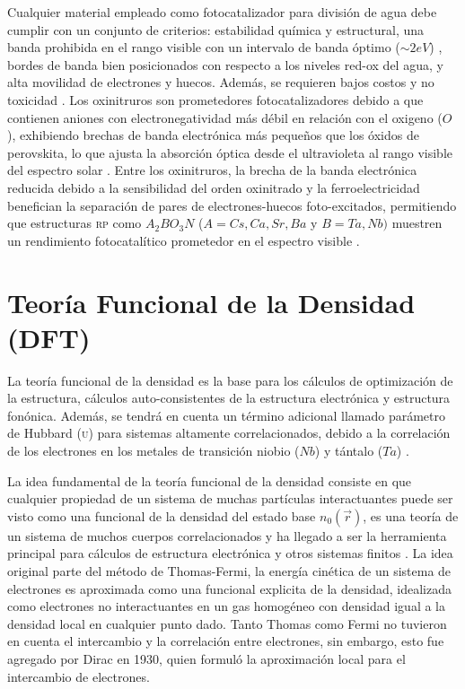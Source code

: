 Cualquier material empleado como fotocatalizador para división de agua debe cumplir con un conjunto de criterios: estabilidad química y estructural, una banda prohibida en el rango visible con un intervalo de banda óptimo ($\sim2eV$) \cite{Cen2019OptimizedSplitting}, bordes de banda bien posicionados con respecto a los niveles red-ox del agua, y alta movilidad de electrones y huecos. Además, se requieren bajos costos y no toxicidad \cite{Castelli_2013}. Los oxinitruros son prometedores fotocatalizadores \cite{Suemoto2018IntergrowthSr2TaO3N,kato2001,wang2015} debido a que contienen aniones con electronegatividad más débil en relación con el oxigeno ($O$), exhibiendo brechas de banda electrónica más pequeños que los óxidos de perovskita, lo que ajusta la absorción óptica desde el ultravioleta al rango visible del espectro solar \cite{Fuertes2015}. Entre los oxinitruros, la brecha de la banda electrónica reducida debido a la sensibilidad del orden oxinitrado \cite{Tobias2004,Yang2011} y la ferroelectricidad benefician la separación de pares de electrones-huecos foto-excitados, permitiendo que estructuras \textsc{rp} como $A_{2}BO_{3}N$ ($A=Cs,Ca,Sr,Ba$ y $ B=Ta,Nb)$ \cite{Cen2019OptimizedSplitting,Pan2018} muestren un rendimiento fotocatalítico prometedor en el espectro visible \cite{Gou2020Photocatalysis,siritanaratkul2011,ZHANG2019}.


\section{Teoría Funcional de la Densidad (DFT)}

La teoría funcional de la densidad es la base para los cálculos de optimización de la estructura, cálculos auto-consistentes de la estructura electrónica y estructura fonónica. Además, se tendrá en cuenta un término adicional llamado parámetro de Hubbard (\textsc{u}) para sistemas altamente correlacionados, debido a la correlación de los electrones en los metales de transición niobio ($Nb$) y tántalo ($Ta$) \cite{Tolba2018}.

La idea fundamental de la teoría funcional de la densidad consiste en que cualquier propiedad de un sistema de muchas partículas interactuantes puede ser visto como una funcional de la densidad del estado base $n_{0}(\Vec{r})$, es una teoría de un sistema de muchos cuerpos correlacionados y ha llegado a ser la herramienta principal para cálculos de estructura electrónica y otros sistemas finitos \cite{martin_2004}. La idea original parte del método de Thomas-Fermi\cite{Fermi1927StatisticalAtoms,Thomas1927TheFields}, la energía cinética de un sistema de electrones es aproximada como una funcional explicita de la densidad, idealizada como electrones no interactuantes en un gas homogéneo con densidad igual a la densidad local en cualquier punto dado. Tanto Thomas como Fermi no tuvieron en cuenta el intercambio y la correlación entre electrones, sin embargo, esto fue agregado por Dirac\cite{Dirac1930NoteAtom} en 1930, quien formuló la aproximación local para el intercambio de electrones.

